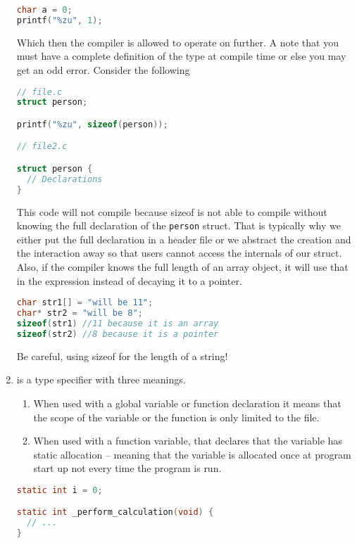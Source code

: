 \begin{enumerate}
\begin{lstlisting}[language=C]
char a = 0;
printf("%zu", 1);
\end{lstlisting}

Which then the compiler is allowed to operate on further. A note that you must have a complete definition of the type at compile time or else you may get an odd error. Consider the following

\begin{lstlisting}[language=C]
// file.c
struct person;

printf("%zu", sizeof(person));

// file2.c

struct person {
  // Declarations
}
\end{lstlisting}

This code will not compile because sizeof is not able to compile  without knowing the full declaration of the \texttt{person} struct. That is typically why we either put the full declaration in a header file or we abstract the creation and the interaction away so that users cannot access the internals of our struct. Also, if the compiler knows the full length of an array object, it will use that in the expression instead of decaying it to a pointer.

\begin{lstlisting}[language=C]
char str1[] = "will be 11";
char* str2 = "will be 8";
sizeof(str1) //11 because it is an array
sizeof(str2) //8 because it is a pointer
\end{lstlisting}

Be careful, using sizeof for the length of a string!

\item {} is a type specifier with three meanings.

\begin{enumerate}
\item When used with a global variable or function declaration it means that the scope of the variable or the function is only limited to the file.
\item When used with a function variable, that declares that the variable has static allocation -- meaning that the variable is allocated once at program start up not every time the program is run.
\end{enumerate}

\begin{lstlisting}[language=C]
static int i = 0;

static int _perform_calculation(void) {
  // ...
}


\end{lstlisting}
\end{enumerate}
